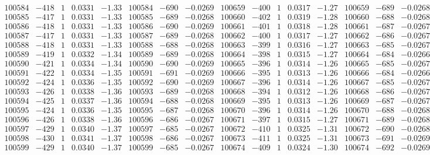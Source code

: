 \documentclass[11pt,reqno,a4letter]{article}
\numberwithin{figure}{section}
\numberwithin{table}{section}
\theoremstyle{plain}
\numberwithin{theorem}{section}
\theoremstyle{definition}
\begin{document}
\begin{table}[ht!]
\begin{equation*}
{\begin{array}{ccccc|ccc||ccccc|ccc}
100584 & -418 & 1 & 0.0331 & -1.33 & 100584 & -690 & -0.0269 & 100659 & -400 & 1 & 0.0317 & -1.27 & 100659 & -689 & -0.0268  \\
100585 & -417 & 1 & 0.0331 & -1.33 & 100585 & -689 & -0.0268 & 100660 & -402 & 1 & 0.0319 & -1.28 & 100660 & -688 & -0.0268  \\
100586 & -418 & 1 & 0.0331 & -1.33 & 100586 & -690 & -0.0269 & 100661 & -401 & 1 & 0.0318 & -1.28 & 100661 & -687 & -0.0267  \\
100587 & -417 & 1 & 0.0331 & -1.33 & 100587 & -689 & -0.0268 & 100662 & -400 & 1 & 0.0317 & -1.27 & 100662 & -686 & -0.0267  \\
100588 & -418 & 1 & 0.0331 & -1.33 & 100588 & -688 & -0.0268 & 100663 & -399 & 1 & 0.0316 & -1.27 & 100663 & -685 & -0.0267  \\
100589 & -419 & 1 & 0.0332 & -1.34 & 100589 & -689 & -0.0268 & 100664 & -398 & 1 & 0.0315 & -1.27 & 100664 & -684 & -0.0266  \\
100590 & -421 & 1 & 0.0334 & -1.34 & 100590 & -690 & -0.0269 & 100665 & -396 & 1 & 0.0314 & -1.26 & 100665 & -685 & -0.0267  \\
100591 & -422 & 1 & 0.0334 & -1.35 & 100591 & -691 & -0.0269 & 100666 & -395 & 1 & 0.0313 & -1.26 & 100666 & -684 & -0.0266  \\
100592 & -424 & 1 & 0.0336 & -1.35 & 100592 & -690 & -0.0269 & 100667 & -396 & 1 & 0.0314 & -1.26 & 100667 & -685 & -0.0267  \\
100593 & -426 & 1 & 0.0338 & -1.36 & 100593 & -689 & -0.0268 & 100668 & -394 & 1 & 0.0312 & -1.26 & 100668 & -686 & -0.0267  \\
100594 & -425 & 1 & 0.0337 & -1.36 & 100594 & -688 & -0.0268 & 100669 & -395 & 1 & 0.0313 & -1.26 & 100669 & -687 & -0.0267  \\
100595 & -424 & 1 & 0.0336 & -1.35 & 100595 & -687 & -0.0268 & 100670 & -396 & 1 & 0.0314 & -1.26 & 100670 & -688 & -0.0268  \\
100596 & -426 & 1 & 0.0338 & -1.36 & 100596 & -686 & -0.0267 & 100671 & -397 & 1 & 0.0315 & -1.27 & 100671 & -689 & -0.0268  \\
100597 & -429 & 1 & 0.0340 & -1.37 & 100597 & -685 & -0.0267 & 100672 & -410 & 1 & 0.0325 & -1.31 & 100672 & -690 & -0.0268  \\
100598 & -430 & 1 & 0.0341 & -1.37 & 100598 & -686 & -0.0267 & 100673 & -411 & 1 & 0.0325 & -1.31 & 100673 & -691 & -0.0269  \\
100599 & -429 & 1 & 0.0340 & -1.37 & 100599 & -685 & -0.0267 & 100674 & -409 & 1 & 0.0324 & -1.30 & 100674 & -692 & -0.0269  \\

\end{array}}
\end{equation*}
\end{table}
\end{document}
